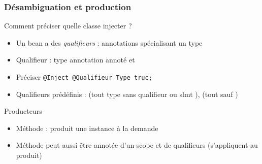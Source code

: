 \documentclass[english, french]{beamer}
\begin{document}
\begin{frame}
	\frametitle{Désambiguation et production}
	Comment préciser quelle classe injecter ?
	\begin{itemize}
		\item Un bean a des \emph{qualifieurs} : annotations spécialisant un type
		\item Qualifieur : type annotation annoté   et 
		\item Préciser \texttt{@Inject @Qualifieur Type truc;}
		\item {\tiny Qualifieurs prédéfinis :  (tout type sans qualifieur {\tiny ou slmt }),  (tout {\tiny sauf })}
	\end{itemize}
	\begin{block}{Producteurs}
		\begin{itemize}
			\item Méthode  : produit une instance à la demande
			\item Méthode peut aussi être annotée d’un scope et de qualifieurs (s’appliquent au produit)
		\end{itemize}
	\end{block}
\end{frame}
\end{document}

